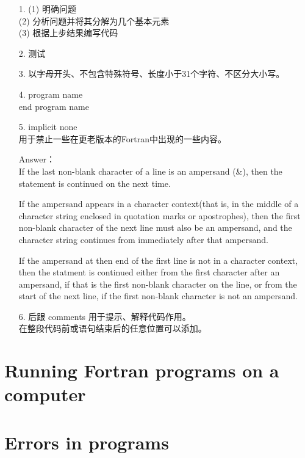 \documentclass[a4paper,titlepage]{report}
\theoremstyle{definition}
\begin{document}
\begin{itemize}
  \item[1.]
  (1) 明确问题 \\
  (2) 分析问题并将其分解为几个基本元素 \\
  (3) 根据上步结果编写代码

  \item[2.]
  测试

  \item[3.]
  以字母开头、不包含特殊符号、长度小于31个字符、不区分大小写。

  \item[4.]
  program name \\
  end program name

  \item[5.]
  implicit none \\
  用于禁止一些在更老版本的Fortran中出现的一些内容。

  Answer： \\
  If the last non-blank character of a line is an ampersand (\&), then the statement is continued on the next time.

  If the ampersand appears in a character context(that is, in the middle of a character string enclosed in quotation marks or apostrophes), then the first non-blank character of the next line must also be an ampersand, and the character string continues from immediately after that ampersand.

  If the ampersand at then end of the first line is not in a character context, then the statment is continued either from the first character after an ampersand, if that is the first non-blank character on the line, or from the start of the next line, if the first non-blank character is not an ampersand.

  \item[6.]
  \! 后跟 comments 用于提示、解释代码作用。 \\
  在整段代码前或语句结束后的任意位置可以添加。

\end{itemize}

\section{Running Fortran programs on a computer}

\section{Errors in programs}
\end{document}
